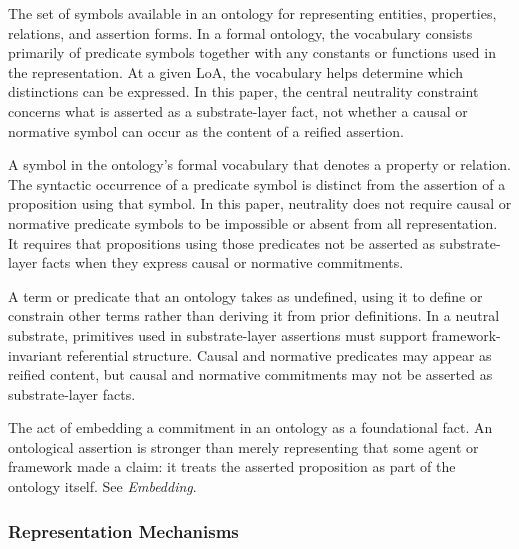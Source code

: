 \begin{description}[style=nextline,leftmargin=1.5cm]

\item[Vocabulary]
The set of symbols available in an ontology for representing
entities, properties, relations, and assertion forms.
In a formal ontology, the vocabulary consists primarily of
predicate symbols together with any constants or functions
used in the representation.
At a given LoA, the vocabulary helps determine
which distinctions can be expressed.
In this paper, the central neutrality constraint concerns
what is asserted as a substrate-layer fact,
not whether a causal or normative symbol can occur
as the content of a reified assertion.

\item[Predicate Symbol]
A symbol in the ontology's formal vocabulary
that denotes a property or relation.
The syntactic occurrence of a predicate symbol
is distinct from the assertion of a proposition using that symbol.
In this paper, neutrality does not require causal or normative
predicate symbols to be impossible or absent from all representation.
It requires that propositions using those predicates
not be asserted as substrate-layer facts when they express
causal or normative commitments.

\item[Ontological Primitive]
A term or predicate that an ontology takes as undefined,
using it to define or constrain other terms
rather than deriving it from prior definitions.
In a neutral substrate, primitives used in substrate-layer
assertions must support framework-invariant referential structure.
Causal and normative predicates may appear as reified content,
but causal and normative commitments may not be asserted
as substrate-layer facts.

\item[Ontological Assertion]
The act of embedding a commitment in an ontology
as a foundational fact.
An ontological assertion is stronger than merely representing
that some agent or framework made a claim:
it treats the asserted proposition as part of the ontology itself.
See \emph{Embedding}.

\end{description}

\subsubsection*{Representation Mechanisms}

